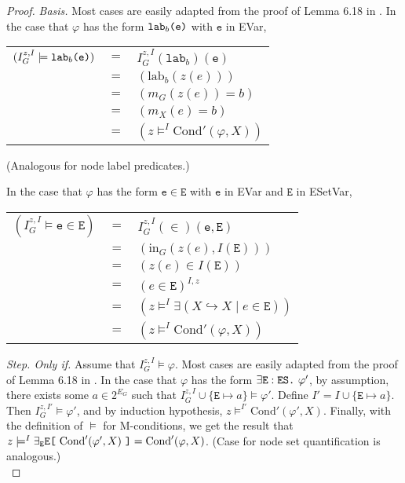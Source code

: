 \documentclass{llncs}
\newcommand{\mt}[1]{\text{\tt{#1}}}
\begin{document}
	\begin{proof}
		\emph{Basis.} Most cases are easily adapted from the proof of Lemma 6.18 in \cite{Poskitt13a}. In the case that $\varphi$ has the form $\mathtt{lab}_b\mt{(}\mathtt{e}\mt{)}$ with $\mathtt{e}$ in EVar,\\
		
		\begin{center}\begin{tabular}{r c l }
			$(I_G^{z,I} \models \mathtt{lab}_b\mt{(}\mathtt{e}\mt{)} )$ & $=$ & $I_G^{z,I}(\mathtt{lab}_b)(\mathtt{e})$ \\
			
			&$=$& $(\text{lab}_b(z(e)))$  \\
			
			& $=$ & $(m_G(z(e)) = b)$  \\
			
			& $=$ & $(m_X(e) = b)$ \\
			
			&$=$& $(z \models^I \text{Cond}'(\varphi,X))$
		\end{tabular}\end{center}
		
		\noindent (Analogous for node label predicates.)
		
		In the case that $\varphi$ has the form $\mathtt{e} \in \mathtt{E}$ with $\mathtt{e}$ in EVar and $\mathtt{E}$ in ESetVar,
		
		\begin{center}\begin{tabular}{r c l }
			$(I_G^{z,I} \models \mathtt{e} \in \mathtt{E} )$ & $=$ & $I_G^{z,I}(\in)(\mathtt{e},\mathtt{E})$ \\
			
			&$=$& $(\text{in}_G(z(e),I(\mathtt{E})))$  \\
			
			& $=$ & $(z(e) \in I(\mathtt{E}))$  \\
			
			& $=$ & $(e \in \mathtt{E})^{I,z}$ \\
			
			& $=$ & $(z \models^I \exists(X\hookrightarrow X \mid e \in \mathtt{E}))$ \\
			
			&$=$& $(z \models^I \text{Cond}'(\varphi,X))$
		\end{tabular}\end{center}
		
		\noindent \emph{Step. Only if.} Assume that $I_G^{z,I} \models \varphi$. Most cases are easily adapted from the proof of Lemma 6.18 in \cite{Poskitt13a}. In the case that $\varphi$ has the form $\exists\mathtt{E}:\mathtt{ES}\mt{.}\ \varphi'$, by assumption, there exists some $a\in 2^{E_G}$ such that $I_G^{z,I} \cup \{\mathtt{E}\mapsto a\} \models \varphi'$. Define $I' = I \cup \{\mathtt{E}\mapsto a\}$. Then $I_G^{z,I'} \models \varphi'$, and by induction hypothesis, $z \models^{I'} \text{Cond}'(\varphi',X)$. Finally, with the definition of $\models$ for M-conditions, we get the result that $z \models^I \exists_\mathtt{E}\mathtt{E}\mt{[}\ \text{Cond}'(\varphi',X)\ \mt{]} = \text{Cond}'(\varphi,X)$. (Case for node set quantification is analogous.)  \\
		

\end{proof}
\end{document}
